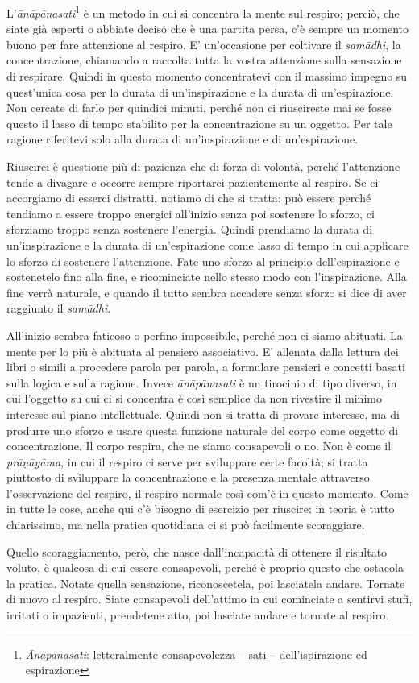 
L'\textit{ānāpānasati}\footnote{\textit{Ānāpānasati}: letteralmente consapevolezza – sati –
dell'ispirazione ed espirazione} è un metodo in cui si concentra la mente sul
respiro; perciò, che siate già esperti o abbiate deciso che è una
partita persa, c'è sempre un momento buono per fare attenzione al
respiro. E' un'occasione per coltivare il \textit{samādhi}, la concentrazione,
chiamando a raccolta tutta la vostra attenzione sulla sensazione di
respirare. Quindi in questo momento concentratevi con il massimo impegno
su quest'unica cosa per la durata di un'inspirazione e la durata di
un'espirazione. Non cercate di farlo per quindici minuti, perché non ci
riuscireste mai se fosse questo il lasso di tempo stabilito per la
concentrazione su un oggetto. Per tale ragione riferitevi solo alla
durata di un'inspirazione e di un'espirazione.

Riuscirci è questione più di pazienza che di forza di volontà, perché
l'attenzione tende a divagare e occorre sempre riportarci pazientemente
al respiro. Se ci accorgiamo di esserci distratti, notiamo di che si
tratta: può essere perché tendiamo a essere troppo energici all'inizio
senza poi sostenere lo sforzo, ci sforziamo troppo senza sostenere
l'energia. Quindi prendiamo la durata di un'inspirazione e la durata di
un'espirazione come lasso di tempo in cui applicare lo sforzo di
sostenere l'attenzione. Fate uno sforzo al principio dell'espirazione e
sostenetelo fino alla fine, e ricominciate nello stesso modo con
l'inspirazione. Alla fine verrà naturale, e quando il tutto sembra
accadere senza sforzo si dice di aver raggiunto il \textit{samādhi}.

All'inizio sembra faticoso o perfino impossibile, perché non ci siamo
abituati. La mente per lo più è abituata al pensiero associativo. E'
allenata dalla lettura dei libri o simili a procedere parola per parola,
a formulare pensieri e concetti basati sulla logica e sulla ragione.
Invece \textit{ānāpānasati} è un tirocinio di tipo diverso, in cui l'oggetto su
cui ci si concentra è così semplice da non rivestire il minimo interesse
sul piano intellettuale. Quindi non si tratta di provare interesse, ma
di produrre uno sforzo e usare questa funzione naturale del corpo come
oggetto di concentrazione. Il corpo respira, che ne siamo consapevoli o
no. Non è come il \textit{prāṇāyāma}, in cui il respiro ci serve per sviluppare
certe facoltà; si tratta piuttosto di sviluppare la concentrazione e la
presenza mentale attraverso l'osservazione del respiro, il respiro
normale così com'è in questo momento. Come in tutte le cose, anche qui
c'è bisogno di esercizio per riuscire; in teoria è tutto chiarissimo, ma
nella pratica quotidiana ci si può facilmente scoraggiare.

Quello scoraggiamento, però, che nasce dall'incapacità di ottenere il
risultato voluto, è qualcosa di cui essere consapevoli, perché è proprio
questo che ostacola la pratica. Notate quella sensazione, riconoscetela,
poi lasciatela andare. Tornate di nuovo al respiro. Siate consapevoli
dell'attimo in cui cominciate a sentirvi stufi, irritati o impazienti,
prendetene atto, poi lasciate andare e tornate al respiro.

